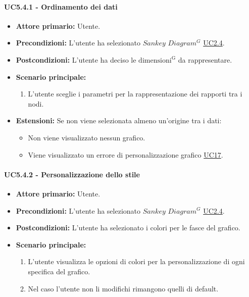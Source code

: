 \paragraph{UC5.4.1 - Ordinamento dei dati}
\label{sec:UC5.4.1}
    \begin{itemize}
        \item \textbf{Attore primario:} Utente.
        \item \textbf{Precondizioni:} L'utente ha selezionato $Sankey$ $Diagram^{G}$ \hyperref[sec:UC2.4]{UC2.4}.
	    \item \textbf{Postcondizioni:} L'utente ha deciso le ${\mathrm{dimensioni^{G}}}$ da rappresentare.
	    \item \textbf{Scenario principale:}
	    \begin{enumerate}
	    		\item L'utente sceglie i parametri per la rappresentazione dei rapporti tra i nodi.
		\end{enumerate}
	    \item \textbf{Estensioni:} Se non viene selezionata almeno un'origine tra i dati:
              \begin{itemize}
                  \item Non viene visualizzato nessun grafico.
                  \item Viene visualizzato un errore di personalizzazione grafico \hyperref[sec:UC17 - Errore di personalizzazione]{UC17}.
              \end{itemize}
    \end{itemize}
\paragraph{UC5.4.2 - Personalizzazione dello stile}
\label{sec:UC5.4.2}
\begin{itemize}
    \item \textbf{Attore primario:} Utente.
    \item \textbf{Precondizioni:} L'utente ha selezionato $Sankey$ $Diagram^{G}$ \hyperref[sec:UC2.4]{UC2.4}.
	\item \textbf{Postcondizioni:} L'utente ha selezionato i colori per le fasce del grafico.
	\item \textbf{Scenario principale:}
	\begin{enumerate}
		\item L'utente visualizza le opzioni di colori per la personalizzazione di ogni specifica del grafico.
		\item Nel caso l'utente non li modifichi rimangono quelli di default.
	\end{enumerate}
\end{itemize}

